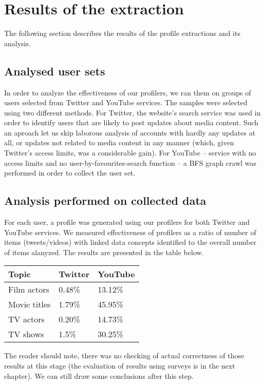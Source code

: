 \section{Results of the extraction}

The following section describes the results of the profile extractions and its
analysis.

\subsection{Analysed user sets}
In order to analyze the effectiveness of our profilers, we ran them on groups of
users selected from Twitter and YouTube services. The samples were selected
using two different methods. For Twitter, the website's search service was used
in order to identify users that are likely to post updates about media content.
Such an aproach let us skip laborous analysis of accounts with hardly any
updates at all, or updates not related to media content in any manner (which,
given Twitter's access limits, was a considerable gain). For YouTube -- service
with no access limits and no user-by-favourites-search function -- a BFS graph
crawl was performed in order to collect the user set.

\subsection{Analysis performed on collected data}

For each user, a profile was generated using our profilers for both Twitter and
YouTube services. We measured effectiveness of profilers as a ratio of number of
items (tweets/videos) with linked data concepts identified to the overall number
of items alanyzed. The results are presented in the table below.


\begin{tabular}{| l | l | l |}
Topic & Twitter & YouTube \\ \hline
Film actors & 0.48\% & 13.12\% \\
Movie titles & 1.79\% & 45.95\% \\
TV actors & 0.20\% & 14.73\% \\
TV shows & 1.5\% & 30.25\% \\
\end{tabular}


The reader should note, there was no checking of actual correctness of those results at
this stage (the evaluation of results using surveys is in the next chapter). We
can still draw some conclusions after this step.

